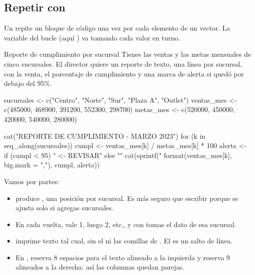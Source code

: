 \subsection{Repetir con \texorpdfstring{}{for}}

Un   repite un bloque de código una vez por
cada elemento de un vector. La variable del bucle (aquí ) va
tomando cada valor en turno.

\begin{ejemplo}{Reporte de cumplimiento por sucursal}
Tienes las ventas y las metas mensuales de cinco sucursales. El director
quiere un reporte de texto, una línea por sucursal, con la venta, el
porcentaje de cumplimiento y una marca de alerta si quedó por debajo del
95\%.
\end{ejemplo}

\begin{rcode}
sucursales <- c("Centro", "Norte", "Sur", "Plaza A", "Outlet")
ventas_mes <- c(485000, 468900, 391200, 552300, 298700)
metas_mes <- c(520000, 450000, 420000, 540000, 280000)

cat("REPORTE DE CUMPLIMIENTO - MARZO 2023\n")
for (k in seq_along(sucursales)) {
  cumpl <- ventas_mes[k] / metas_mes[k] * 100
  alerta <- if (cumpl < 95) "  <- REVISAR" else ""
  cat(sprintf("%
              format(ventas_mes[k], big.mark = ","), cumpl, alerta))
}
\end{rcode}

Vamos por partes:

\begin{itemize}
  \item {} produce , una
        posición por sucursal. Es más seguro que escribir 
        porque se ajusta solo si agregas sucursales.
  \item En cada vuelta,  vale 1, luego 2, etc., y con
        \codigo{[k]} tomas el dato de esa sucursal.
  \item {} imprime texto tal cual, sin el \codigo{[1]} ni las
        comillas de . El  es un
        salto de línea.
  \item En ,  reserva 8 espacios para el
        texto alineado a la izquierda y  reserva 9 alineados a
        la derecha: así las columnas quedan parejas.
\end{itemize}

